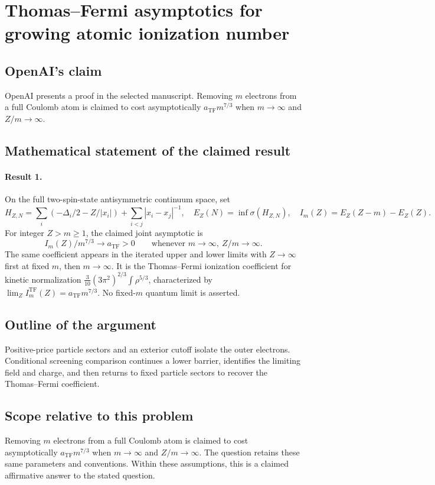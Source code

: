 \documentclass[11pt]{article}
\begin{document}
\section*{Thomas–Fermi asymptotics for growing atomic ionization number}

\subsection{OpenAI's claim}
OpenAI presents a proof in the selected manuscript. Removing $m$ electrons from a full Coulomb atom is claimed to cost asymptotically $a_{\mathrm{TF}}m^{7/3}$ when $m\to\infty$ and $Z/m\to\infty$.

\subsection{Mathematical statement of the claimed result}
\paragraph{Result 1.} On the full two-spin-state antisymmetric continuum space, set
\[
 H_{Z,N}=\sum_i(-\Delta_i/2-Z/|x_i|)+\sum_{i<j}|x_i-x_j|^{-1},
 \quad E_Z(N)=\inf\sigma(H_{Z,N}),\quad I_m(Z)=E_Z(Z-m)-E_Z(Z).
\]
For integer \(Z>m\ge1\), the claimed joint asymptotic is
\[
 I_m(Z)/m^{7/3}\to a_{\mathrm{TF}}>0
 \qquad\text{whenever }m\to\infty,\ Z/m\to\infty.
\]
The same coefficient appears in the iterated upper and lower limits with \(Z\to\infty\) first at fixed \(m\), then \(m\to\infty\). It is the Thomas--Fermi ionization coefficient for kinetic normalization \(\tfrac3{10}(3\pi^2)^{2/3}\int\rho^{5/3}\), characterized by \(\lim_ZI_m^{\mathrm{TF}}(Z)=a_{\mathrm{TF}}m^{7/3}\). No fixed-\(m\) quantum limit is asserted.

\subsection{Outline of the argument}
Positive-price particle sectors and an exterior cutoff isolate the outer electrons. Conditional screening comparison continues a lower barrier, identifies the limiting field and charge, and then returns to fixed particle sectors to recover the Thomas--Fermi coefficient.

\subsection{Scope relative to this problem}
Removing $m$ electrons from a full Coulomb atom is claimed to cost asymptotically $a_{\mathrm{TF}}m^{7/3}$ when $m\to\infty$ and $Z/m\to\infty$. The question retains these same parameters and conventions. Within these assumptions, this is a claimed affirmative answer to the stated question.
\end{document}
